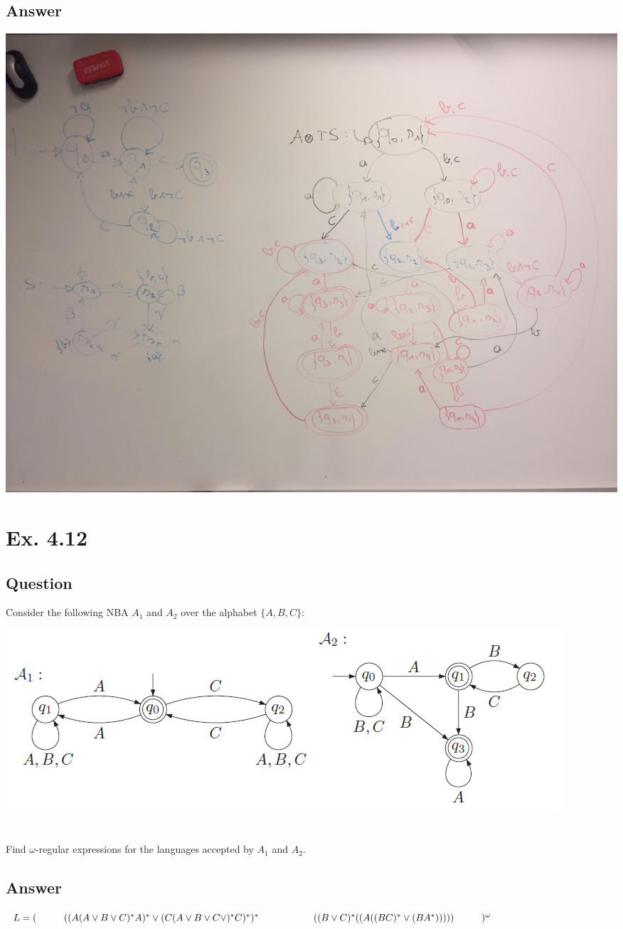 \documentclass[12pt]{article}
\newcommand\tab[1][1cm]{\hspace*{#1}}
\begin{document}
\subsection*{Answer}
\begin{centering}
	\includegraphics*[scale=0.15]{ex45.jpg}
\end{centering}

\newpage
\section*{Ex. 4.12}
\subsection*{Question}
Consider the following NBA $A_1$ and $A_2$ over the alphabet $\{ A,B,C \}$:\\
\begin{centering}
	\includegraphics*[scale=0.8]{ex412.PNG}
\end{centering}\\
Find $\omega$-regular expressions for the languages accepted by $A_1$ and $A_2$.

\subsection*{Answer}
$L = (\tab((A(A\vee B\vee C)^*A)^*\vee (C(A\vee B\vee C\vee)^*C)^*)^*\\
			\tab\tab((B\vee C)^*((A((BC)^*\vee (BA^*)))))\\
		\tab)^\omega$
\end{document}
